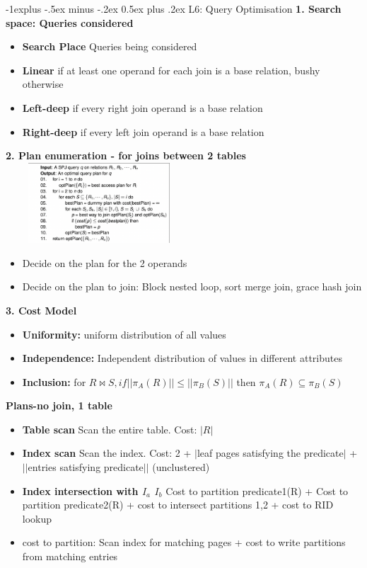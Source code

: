 \documentclass[10pt, landscape]{article}
\makeatletter
\renewcommand{\subsection}{\@startsection{subsection}{2}{0mm}%
                                {-1explus -.5ex minus -.2ex}%
                                {0.5ex plus .2ex}%
                                {\normalfont\normalsize\bfseries}}
\makeatother
\begin{document}
\begin{multicols}{4}
\subsection{L6: Query Optimisation}
\textbf{1. Search space: Queries considered} \\ 
\begin{itemize}
  \item \textbf{Search Place} Queries being considered
  \item \textbf{Linear} if at least one operand for each join is a base relation, bushy otherwise
  \item \textbf{Left-deep} if every right join operand is a base relation 
  \item \textbf{Right-deep} if every left join operand is a base relation
\end{itemize}


\textbf{2. Plan enumeration - for joins between 2 tables} \\
\includegraphics[width=7cm, height =3cm]{dp_l6.png}

\begin{itemize}
  \item Decide on the plan for the 2 operands 
  \item Decide on the plan to join: Block nested loop, sort merge join, grace hash join
\end{itemize}

\textbf{3. Cost Model} \\
\begin{itemize}
  \item \textbf{Uniformity:} uniform distribution of all values
  \item \textbf{Independence:} Independent distribution of values in different attributes
  \item \textbf{Inclusion:} for $R\bowtie S, if ||\pi_A(R)|| \leq ||\pi_B(S)||$ then $\pi_A(R) \subseteq \pi_B(S)$
\end{itemize}

\textbf{Plans-no join, 1 table} \\
\begin{itemize}
  \item \textbf{Table scan} Scan the entire table. Cost: $|R|$
  \item \textbf{Index scan} Scan the index. Cost: 2 + $|$leaf pages satisfying the predicate$|$ + $||$entries satisfying predicate$||$ (unclustered)
  \item \textbf{Index intersection with $I_a$ $I_b$} Cost to partition predicate1(R) + Cost to partition predicate2(R) + cost to intersect partitions 1,2 + cost to RID lookup
  \item cost to partition: Scan index for matching pages + cost to write partitions from matching entries
\end{itemize}



\end{multicols}
\end{document}
